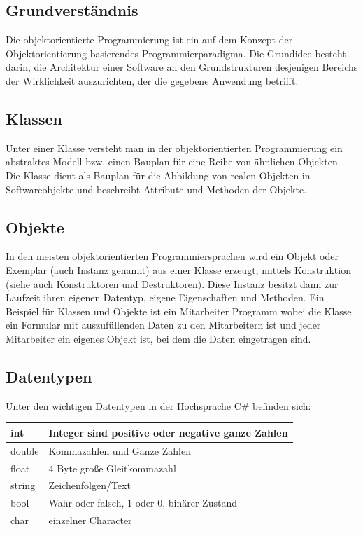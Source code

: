 \documentclass[12pt,a4paper]{article}
\begin{document}
\subsection{Grundverständnis}
    Die objektorientierte Programmierung ist ein auf dem Konzept der Objektorientierung basierendes
    Programmierparadigma. Die Grundidee besteht darin, die Architektur einer Software an den Grundstrukturen desjenigen
    Bereichs der Wirklichkeit auszurichten, der die gegebene Anwendung betrifft.

\subsection{Klassen}
    Unter einer Klasse versteht man in der objektorientierten Programmierung ein abstraktes Modell bzw. einen Bauplan für eine Reihe von ähnlichen Objekten. Die Klasse dient als Bauplan für die Abbildung von realen Objekten in Softwareobjekte und beschreibt Attribute und Methoden der Objekte.

\subsection{Objekte}
    In den meisten objektorientierten Programmiersprachen wird ein Objekt oder Exemplar (auch Instanz genannt) aus einer Klasse erzeugt, mittels Konstruktion (siehe auch Konstruktoren und Destruktoren). Diese Instanz besitzt dann zur Laufzeit ihren eigenen Datentyp, eigene Eigenschaften und Methoden. Ein Beispiel für Klassen und Objekte ist ein Mitarbeiter Programm wobei die Klasse ein Formular mit auszufüllenden Daten zu den Mitarbeitern ist und jeder Mitarbeiter ein eigenes Objekt ist, bei dem die Daten eingetragen sind.

\subsection{Datentypen}
    Unter den wichtigen Datentypen in der Hochsprache C\# befinden sich:
    \begin{table}[h]
        \centering
        \begin{tabularx}{17cm}{|X|X|}
            \hline
            int & Integer sind positive oder negative ganze Zahlen\\
            \hline
            double & Kommazahlen und Ganze Zahlen\\
            \hline
            float & 4 Byte große Gleitkommazahl\\
            \hline
            string & Zeichenfolgen/Text\\
            \hline
            bool & Wahr oder falsch, 1 oder 0, binärer Zustand\\
            \hline
            char & einzelner Character\\
            \hline
        \end{tabularx}
    \end{table}
\end{document}
